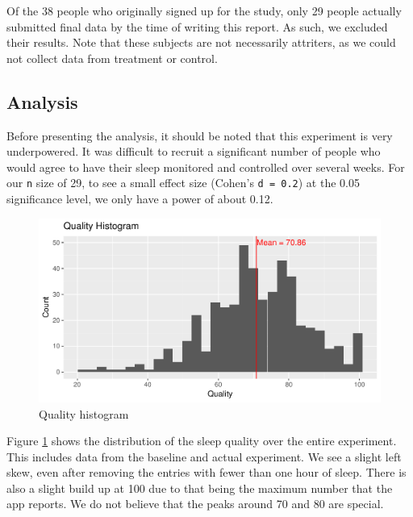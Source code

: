 \documentclass[12pt,]{article}
\begin{document}
Of the 38 people who originally signed up for the study, only 29 people
actually submitted final data by the time of writing this report. As
such, we excluded their results. Note that these subjects are not
necessarily attriters, as we could not collect data from treatment or
control.

\hypertarget{analysis}{%
\subsection{Analysis}\label{analysis}}

Before presenting the analysis, it should be noted that this experiment
is very underpowered. It was difficult to recruit a significant number
of people who would agree to have their sleep monitored and controlled
over several weeks. For our \texttt{n} size of 29, to see a small effect
size (Cohen's \texttt{d\ =\ 0.2}) at the 0.05 significance level, we
only have a power of about 0.12.

\begin{figure}
\centering
\includegraphics{report_files/figure-latex/quality_histogram-1.pdf}
\caption{\label{fig:quality_histogram} Quality histogram}
\end{figure}

Figure \ref{fig:quality_histogram} shows the distribution of the sleep
quality over the entire experiment. This includes data from the baseline
and actual experiment. We see a slight left skew, even after removing
the entries with fewer than one hour of sleep. There is also a slight
build up at 100 due to that being the maximum number that the app
reports. We do not believe that the peaks around 70 and 80 are special.
\end{document}
